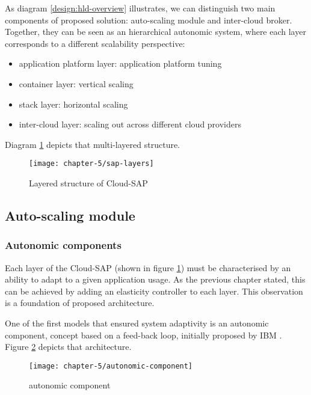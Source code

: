 As diagram \ref{design:hld-overview} illustrates, we can distinguish two main components of proposed solution: auto-scaling module and inter-cloud broker. Together, they can be seen as an hierarchical autonomic system, where each layer corresponds to a different scalability perspective:
\begin{itemize}
	\item application platform layer: application platform tuning
	\item container layer: vertical scaling
	\item stack layer: horizontal scaling
	\item inter-cloud layer: scaling out across different cloud providers
\end{itemize}

Diagram \ref{design:csap-layers} depicts that multi-layered structure.

\begin{figure}[!ht]
  \begin{center}
    \texttt{[image: chapter-5/sap-layers]}
  \end{center}
  \caption{Layered structure of Cloud-SAP}
  \label{design:csap-layers}
\end{figure}

\subsection{Auto-scaling module}

\subsubsection{Autonomic components}
Each layer of the Cloud-SAP (shown in figure \ref{design:csap-layers}) must be characterised by an ability to adapt to a given application usage. As the previous chapter stated, this can be achieved by adding an elasticity controller to each layer. This observation is a foundation of proposed architecture.

One of the first models that ensured system adaptivity is an autonomic component, concept based on a feed-back loop, initially proposed by IBM \cite{IBM06}. Figure \ref{design:autonomic-component} depicts that architecture. 

\begin{figure}[!ht]
  \begin{center}
    \texttt{[image: chapter-5/autonomic-component]}
  \end{center}
  \caption{autonomic component}
  \label{design:autonomic-component}
\end{figure}

